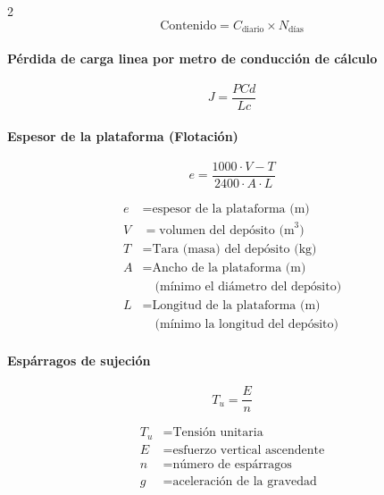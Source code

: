 \documentclass[11pt]{article}
\begin{document}
\begin{multicols*}{2}
    \begin{equation*}
        \text{Contenido} = C_{\text{diario}} \times N_{\text{días}}
    \end{equation*}

    \paragraph{Pérdida de carga linea por metro de conducción de cálculo}

    \begin{equation*}
        J = \frac{PCd}{Lc}
    \end{equation*}

    \paragraph{Espesor de la plataforma (Flotación)}
    \begin{equation*}
        e = \frac{1000 \cdot V - T}{2400 \cdot A \cdot L}
    \end{equation*}
    \begin{minipage}{\linewidth}
        \scriptsize
        \begin{align*}
            e &= \text{espesor de la plataforma (m)} \\
            V &= \text{volumen del depósito (m}^3\text{)} \\
            T &= \text{Tara (masa) del depósito (kg)} \\
            A &= \text{Ancho de la plataforma (m)} \\
            &\quad \text{(mínimo el diámetro del depósito)} \\
            L &= \text{Longitud de la plataforma (m)} \\
            &\quad \text{(mínimo la longitud del depósito)}
        \end{align*}
    \end{minipage}

    \paragraph{Espárragos de sujeción}

    \begin{equation*}
        T_u = \frac{E}{n}
    \end{equation*}

    \begin{minipage}{\linewidth}
        \scriptsize
        \begin{align*}
            T_u &= \text{Tensión unitaria} \\
            E &= \text{esfuerzo vertical ascendente} \\
            n &= \text{número de espárragos} \\
            g &= \text{aceleración de la gravedad}
        \end{align*}
    \end{minipage}


\end{multicols*}
\end{document}
